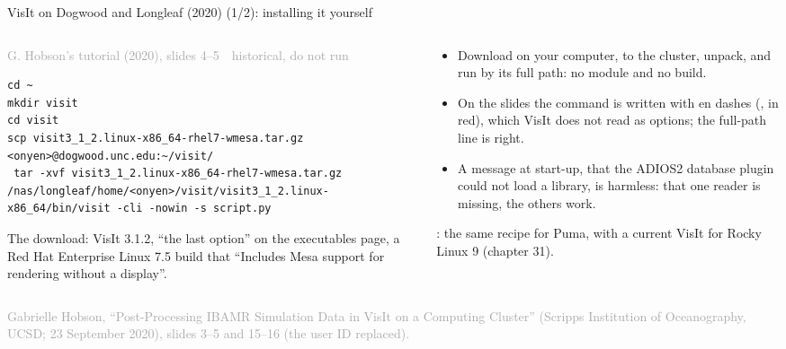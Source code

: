 \documentclass[aspectratio=169,11pt]{beamer}
\newcommand{\sourcecredit}[1]{\vfill\begin{flushright}\tiny\textcolor{DarkGray}{#1}\end{flushright}}
\newcommand{\ndashmark}{\textcolor{RubineRed}{\rmfamily\textendash}}
\newcommand{\hist}[1]{{\tiny\sffamily\textcolor{DarkGray}{#1\ \textbullet\ historical, do not run}}\par\nointerlineskip\vspace{0.3mm}}
\begin{document}
\begin{frame}[fragile]{VisIt on Dogwood and Longleaf (2020) (1/2): installing it yourself}
\label{fr:visitdw}
\begin{columns}[T,onlytextwidth]
\begin{column}{0.53\textwidth}
\hist{G. Hobson's tutorial (2020), slides 4--5}
\begin{lstlisting}[style=hist]
cd ~
mkdir visit
cd visit
scp visit3_1_2.linux-x86_64-rhel7-wmesa.tar.gz <onyen>@dogwood.unc.edu:~/visit/
 tar -xvf visit3_1_2.linux-x86_64-rhel7-wmesa.tar.gz
/nas/longleaf/home/<onyen>/visit/visit3_1_2.linux-x86_64/bin/visit -cli -nowin -s script.py
\end{lstlisting}
\footnotesize The download: VisIt 3.1.2, ``the last option'' on the executables page, a Red Hat Enterprise Linux 7.5 build that ``Includes Mesa support for rendering without a display''.
\end{column}
\begin{column}{0.44\textwidth}
\footnotesize
\begin{itemize}\setlength{\itemsep}{2pt}
  \item Download on your computer,  to the cluster, unpack, and run by its full path: no module and no build.
  \item On the slides the command is written with en dashes (\code{\ndashmark{}cli \ndashmark{}nowin \ndashmark{}s}, in red), which VisIt does not read as options; the full-path line is right.
  \item A message at start-up, that the ADIOS2 database plugin could not load a library, is harmless: that one reader is missing, the others work.
\end{itemize}
\vspace{1mm}
: the same recipe for Puma, with a current VisIt for Rocky Linux 9 (chapter 31).
\end{column}
\end{columns}
\sourcecredit{Gabrielle Hobson, ``Post-Processing IBAMR Simulation Data in VisIt on a Computing Cluster'' (Scripps Institution of Oceanography, UCSD; 23 September 2020), slides 3--5 and 15--16 (the user ID replaced).}
\end{frame}
\end{document}
